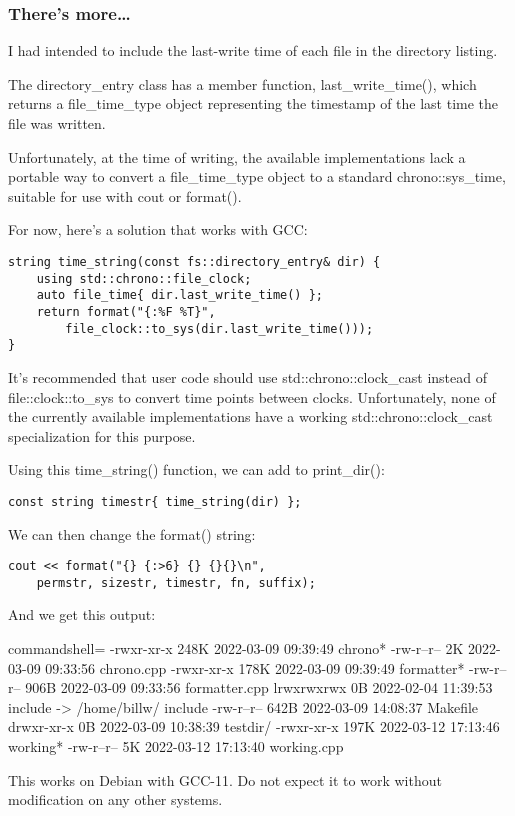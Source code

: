 \subsubsection{There's more…}

I had intended to include the last-write time of each file in the directory listing.

The directory\_entry class has a member function, last\_write\_time(), which returns a file\_time\_type object representing the timestamp of the last time the file was written.

Unfortunately, at the time of writing, the available implementations lack a portable way to convert a file\_time\_type object to a standard chrono::sys\_time, suitable for use with cout or format().

For now, here's a solution that works with GCC:

\begin{lstlisting}[style=styleCXX]
string time_string(const fs::directory_entry& dir) {
	using std::chrono::file_clock;
	auto file_time{ dir.last_write_time() };
	return format("{:%F %T}",
		file_clock::to_sys(dir.last_write_time()));
}
\end{lstlisting}

It's recommended that user code should use std::chrono::clock\_cast instead of file::clock::to\_sys to convert time points between clocks. Unfortunately, none of the currently available implementations have a working std::chrono::clock\_cast specialization for this purpose.

Using this time\_string() function, we can add to print\_dir():

\begin{lstlisting}[style=styleCXX]
const string timestr{ time_string(dir) };
\end{lstlisting}

We can then change the format() string:

\begin{lstlisting}[style=styleCXX]
cout << format("{} {:>6} {} {}{}\n",
	permstr, sizestr, timestr, fn, suffix);
\end{lstlisting}

And we get this output:

\begin{tcblisting}{commandshell={}}
-rwxr-xr-x 248K 2022-03-09 09:39:49 chrono*
-rw-r--r--   2K 2022-03-09 09:33:56 chrono.cpp
-rwxr-xr-x 178K 2022-03-09 09:39:49 formatter*
-rw-r--r-- 906B 2022-03-09 09:33:56 formatter.cpp
lrwxrwxrwx   0B 2022-02-04 11:39:53 include -> /home/billw/
include
-rw-r--r-- 642B 2022-03-09 14:08:37 Makefile
drwxr-xr-x   0B 2022-03-09 10:38:39 testdir/
-rwxr-xr-x 197K 2022-03-12 17:13:46 working*
-rw-r--r--   5K 2022-03-12 17:13:40 working.cpp
\end{tcblisting}

This works on Debian with GCC-11. Do not expect it to work without modification on any other systems.










